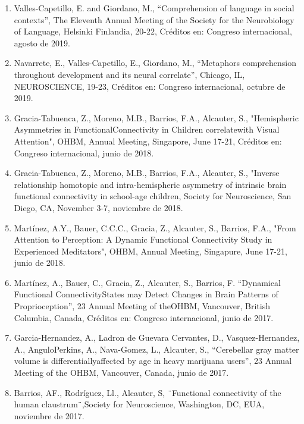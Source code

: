 \begin{enumerate}
\item  Valles-Capetillo, E. and Giordano, M., “Comprehension of language in social contexts”, The Eleventh Annual Meeting of 
the 
Society for the Neurobiology of Language, Helsinki Finlandia, 20-22, Créditos en: Congreso internacional, agosto de 2019.

\item  Navarrete, E., Valles-Capetillo, E., Giordano, M., “Metaphors comprehension throughout development and its neural 
correlate”, Chicago, IL, NEUROSCIENCE, 19-23, Créditos en: Congreso internacional, octubre de 2019.

\item  Gracia-Tabuenca, Z., Moreno, M.B., Barrios, F.A., Alcauter, S., "Hemispheric Asymmetries in FunctionalConnectivity in 
Children correlatewith Visual Attention", OHBM, Annual Meeting, Singapore, June 17-21, Créditos en: Congreso internacional, 
junio de 2018.

\item  Gracia-Tabuenca, Z., Moreno, M.B., Barrios, F.A., Alcauter, S., "Inverse relationship homotopic and intra-hemispheric 
asymmetry of intrinsic brain functional connectivity in school-age children, Society for Neuroscience, San Diego, CA, 
November 3-7, noviembre de 2018.

\item  Martínez, A.Y., Bauer, C.C.C., Gracia, Z., Alcauter, S., Barrios, F.A., "From Attention to Perception: A Dynamic 
Functional Connectivity Study in Experienced Meditators", OHBM, Annual Meeting, Singapure, June 17-21, junio de 2018.

\item  Martínez, A., Bauer, C., Gracia, Z., Alcauter, S., Barrios, F. “Dynamical Functional ConnectivityStates may Detect 
Changes in Brain Patterns of Proprioception”, 23 Annual Meeting of theOHBM, Vancouver, British Columbia, Canada, Créditos en: 
Congreso internacional, junio de 2017.

\item  Garcia-Hernandez, A., Ladron de Guevara Cervantes, D., Vasquez-Hernandez, A., AnguloPerkins, A., Nava-Gomez, L., 
Alcauter, S., “Cerebellar gray matter volume is differentiallyaffected by age in heavy marijuana users”, 23 Annual Meeting of 
the OHBM, Vancouver, Canada, junio de 2017.

\item  Barrios, AF., Rodríguez, Ll., Alcauter, S, ¨Functional connectivity of the human claustrum¨,Society
for Neuroscience, Washington, DC, EUA, noviembre de 2017.


\end{enumerate}
